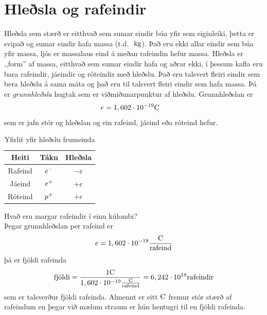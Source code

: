 \section{Hleðsla og rafeindir}
Hleðsla sem stærð er eitthvað sem sumar eindir búa yfir sem eiginleiki,
þetta er svipað og sumar eindir hafa massa (t.d. $\textrm{ k}\textrm{g}$). Það
eru ekki allar eindir sem búa yfir massa, ljós er massalaus eind á meðan
rafeindin hefur massa. Hleðsla er ,,form'' af massa, eitthvað sem sumar
eindir hafa og aðrar ekki, í þessum kafla eru bara rafeindir, jáeindir
og róteindir með hleðslu. Það eru talsvert fleiri eindir sem bera hleðslu
á sama máta og það eru til talsvert fleiri eindir sem hafa massa. Þá
er \emph{grunnhleðsla} hugtak sem er viðmiðunarpunktur af hleðslu.
Grunnhleðslan er
\begin{align}
	e &= 1,602 \cdot 10^{-19} \text{C}
\end{align}
sem er jafn stór og hleðslan og ein rafeind, jáeind eða róteind hefur.
\begin{table}[!h]
	\begin{center}
	\begin{tabular}{ccc}
	\toprule
	Heiti & Tákn & Hleðsla \\
	\midrule
	Rafeind  & $e^-$ & $-e$ \\
	Jáeind  & $e^+$ & $+e$ \\
	Róteind  & $p^+$ & $+e$ \\
	\bottomrule
	\end{tabular}
	\end{center}
	\caption{Yfirlit yfir hleðslu frumeinda}
\end{table}
\begin{formalexample}
Hvað eru margar rafeindir í einu kúlombi?
\\[4 ex]
Þegar grunnhleðslan per rafeind er
\[
	e = 1,602 \cdot 10^{-19} \frac{\text{C}}{\text{rafeind}}
\]
þá er fjöldi rafeinda
\begin{align*}
	\text{fjöldi} =
		\frac{ 1 \text{C}}{1,602 \cdot 10^{-19} \frac{\text{C}}{\text{rafeind}} }
	= 6,242 \cdot 10^{18} \text{rafeindir}
\end{align*}
sem er talsverður fjöldi rafeinda. Almennt er eitt $\text{C}$ fremur stór stærð
af rafeindum en þegar við mælum straum er hún hentugri til en fjöldi rafeinda.
\end{formalexample}

